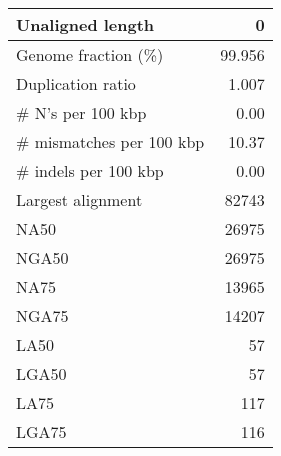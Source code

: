 \documentclass[12pt,a4paper]{article}
\begin{document}
\begin{table}[ht]
\begin{center}
\begin{tabular}{|l*{1}{|r}|}
Unaligned length & 0 \\ \hline
Genome fraction (\%) & 99.956 \\ \hline
Duplication ratio & 1.007 \\ \hline
\# N's per 100 kbp & 0.00 \\ \hline
\# mismatches per 100 kbp & 10.37 \\ \hline
\# indels per 100 kbp & 0.00 \\ \hline
Largest alignment & 82743 \\ \hline
NA50 & 26975 \\ \hline
NGA50 & 26975 \\ \hline
NA75 & 13965 \\ \hline
NGA75 & 14207 \\ \hline
LA50 & 57 \\ \hline
LGA50 & 57 \\ \hline
LA75 & 117 \\ \hline
LGA75 & 116 \\ \hline
\end{tabular}
\end{center}
\end{table}
\end{document}
